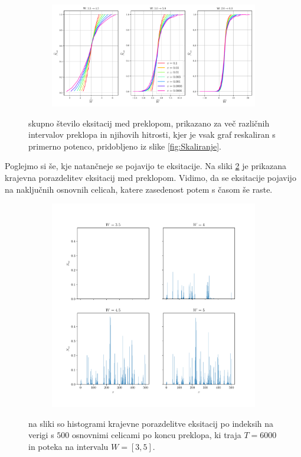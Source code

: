 \begin{figure}[H]
\centering
\begin{subfigure}{.99\textwidth}
\includegraphics[width=\linewidth]{Figures/SkoziCasAlt.pdf}
\end{subfigure}
\caption{skupno število eksitacij med preklopom, prikazano za več različnih intervalov preklopa in njihovih hitrosti, kjer je vsak graf reskaliran s primerno potenco, pridobljeno iz slike \ref{fig:Skaliranje}.}
\label{fig:SkoziCasAlt}
\end{figure}
Poglejmo si še, kje natančneje se pojavijo te eksitacije. Na sliki \ref{fig:Krajevne} je prikazana krajevna porazdelitev eksitacij med preklopom. Vidimo, da se eksitacije pojavijo na naključnih osnovnih celicah, katere zasedenost potem s časom še raste.
\begin{figure}[H]
\centering
\begin{subfigure}{.99\textwidth}
\includegraphics[width=\linewidth]{Figures/KrajevneEksitacijeNoGrid.pdf}
\end{subfigure}
\caption{na sliki so histogrami krajevne porazdelitve eksitacij po indeksih na verigi s $500$ osnovnimi celicami po koncu preklopa, ki traja $T=6000$ in poteka na intervalu $W=[3,5]$.}
\label{fig:Krajevne}
\end{figure}


